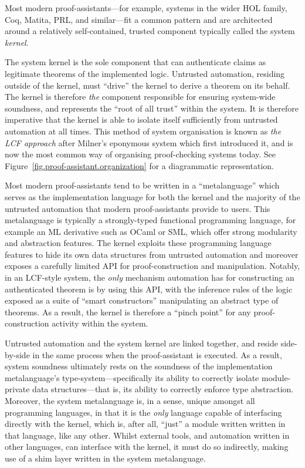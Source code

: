 \documentclass[a4paper, UKenglish, cleveref, autoref, thm-restate, colorlinks]{lipics-v2021}
\begin{document}
Most modern proof-assistants---for example, systems in the wider HOL family, Coq, Matita, PRL, and similar---fit a common pattern and are architected around a relatively self-contained, trusted component typically called the system \emph{kernel}.

The system kernel is the sole component that can authenticate claims as legitimate theorems of the implemented logic.
Untrusted automation, residing outside of the kernel, must ``drive'' the kernel to derive a theorem on its behalf.
The kernel is therefore \emph{the} component responsible for ensuring system-wide soundness, and represents the ``root of all trust'' within the system.
It is therefore imperative that the kernel is able to isolate itself sufficiently from untrusted automation at all times.
This method of system organisation is known as \emph{the LCF approach} after Milner's eponymous system which first introduced it, and is now the most common way of organising proof-checking systems today.
See Figure~\ref{fig.proof-assistant.organization} for a diagrammatic representation.

Most modern proof-assistants tend to be written in a ``metalanguage'' which serves as the implementation language for both the kernel and the majority of the untrusted automation that modern proof-assistants provide to users.
This metalanguage is typically a strongly-typed functional programming language, for example an ML derivative such as OCaml or SML, which offer strong modularity and abstraction features.
The kernel exploits these programming language features to hide its own data structures from untrusted automation and moreover exposes a carefully limited API for proof-construction and manipulation.
Notably, in an LCF-style system, the \emph{only} mechanism automation has for constructing an authenticated theorem is by using this API, with the inference rules of the logic exposed as a suite of ``smart constructors'' manipulating an abstract type of theorems.
As a result, the kernel is therefore a ``pinch point'' for any proof-construction activity within the system.

Untrusted automation and the system kernel are linked together, and reside side-by-side in the same process when the proof-assistant is executed.
As a result, system soundness ultimately rests on the soundness of the implementation metalanguage's type-system---specifically its ability to correctly isolate module-private data structures---that is, its ability to correctly enforce type abstraction.
Moreover, the system metalanguage is, in a sense, unique amongst all programming languages, in that it is the \emph{only} language capable of interfacing directly with the kernel, which is, after all, ``just'' a module written written in that language, like any other.
Whilst external tools, and automation written in other languages, can interface with the kernel, it must do so indirectly, making use of a shim layer written in the system metalanguage.
\end{document}
